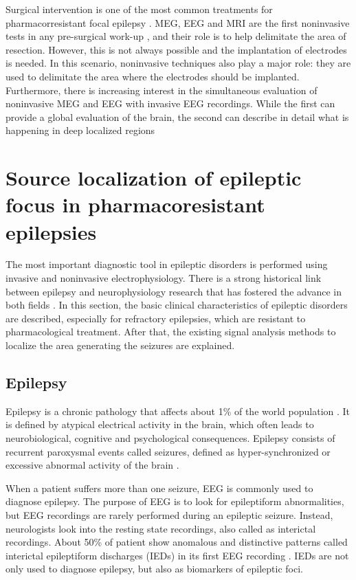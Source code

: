 Surgical intervention is one of the most common treatments for pharmacorresistant focal epilepsy \citep{Ramey2013}. MEG, EEG and MRI are the first noninvasive tests in any pre-surgical work-up \citep{Grova2016}, and their role is to help delimitate the area of resection. However, this is not always possible and the implantation of electrodes is needed. In this scenario, noninvasive techniques also play a major role: they are used to delimitate the area where the electrodes should be implanted. Furthermore, there is increasing interest in the simultaneous evaluation of noninvasive MEG and EEG with invasive EEG recordings. While the first can provide a global evaluation of the brain, the second can describe in detail what is happening in deep localized regions \citep{Grova2016}

\section{Source localization of epileptic focus in pharmacoresistant epilepsies}

The most important diagnostic tool in epileptic disorders is performed using invasive and noninvasive electrophysiology. There is a strong historical link between epilepsy and neurophysiology research that has fostered the advance in both fields \citep{Schomer2010}. In this section, the basic clinical characteristics of epileptic disorders are described, especially for refractory epilepsies, which are resistant to pharmacological treatment. After that, the existing signal analysis methods to localize the area generating the seizures are explained.

\subsection{Epilepsy}

Epilepsy is a chronic pathology that affects about 1\% of the world population \citep{Ramey2013}. It is defined by atypical electrical activity in the brain, which often leads to neurobiological, cognitive and psychological consequences. Epilepsy consists of recurrent paroxysmal events called seizures, defined as hyper-synchronized or excessive abnormal activity of the brain \citep{Frohlich2016}.

When a patient suffers more than one seizure, EEG is commonly used to diagnose epilepsy. The purpose of EEG is to look for epileptiform abnormalities, but EEG recordings are rarely performed during an epileptic seizure. Instead, neurologists look into the resting state recordings, also called as interictal recordings. About 50\% of patient show anomalous and distinctive patterns called interictal epileptiform discharges (IEDs) in its first EEG recording \citep{Smith2005}. IEDs are not only used to diagnose epilepsy, but also as biomarkers of epileptic foci. 

